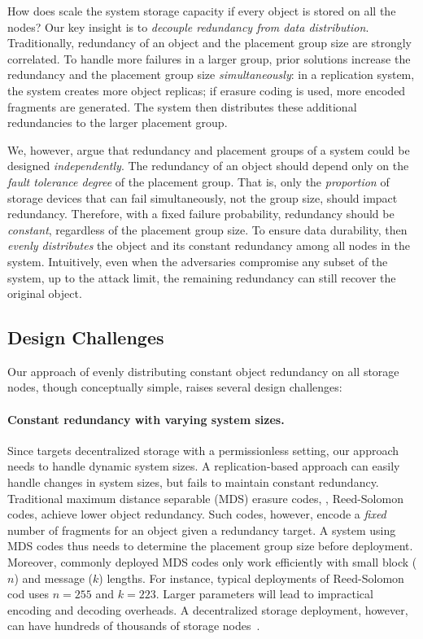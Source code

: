 How does \sys scale the system storage capacity if every object is stored on all the nodes?
Our key insight is to \emph{decouple redundancy from data distribution}.
Traditionally, redundancy of an object and the placement group size are strongly correlated.
To handle more failures in a larger group, prior solutions increase the redundancy and the placement group size \emph{simultaneously}:
in a replication system, the system creates more object replicas;
if erasure coding is used, more encoded fragments are generated.
The system then distributes these additional redundancies to the larger placement group.

We, however, argue that redundancy and placement groups of a system could be designed \emph{independently}.
The redundancy of an object should depend only on the \emph{fault tolerance degree} of the placement group.
That is, only the \emph{proportion} of storage devices that can fail simultaneously, not the group size, should impact redundancy.
Therefore, with a fixed failure probability, redundancy should be \emph{constant}, regardless of the placement group size.
To ensure data durability, \sys then \emph{evenly distributes} the object and its constant redundancy among all nodes in the system.
Intuitively, even when the adversaries compromise any subset of the system, up to the attack limit, the remaining redundancy can still recover the original object.

\subsection{Design Challenges}
\label{sec:approach:challenges}

Our approach of evenly distributing constant object redundancy on all storage nodes, though conceptually simple, raises several design challenges:

\paragraph{Constant redundancy with varying system sizes.}
Since \sys targets decentralized storage with a permissionless setting, our approach needs to handle dynamic system sizes.
A replication-based approach can easily handle changes in system sizes, but fails to maintain constant redundancy.
Traditional maximum distance separable (MDS) erasure codes, \eg,  Reed-Solomon codes, achieve lower object redundancy.
Such codes, however, encode a \emph{fixed} number of fragments for an object given a redundancy target.
A system using MDS codes thus needs to determine the placement group size before deployment.
Moreover, commonly deployed MDS codes only work efficiently with small block ($n$) and message ($k$) lengths.
For instance, typical deployments of Reed-Solomon cod uses $n = 255$ and $k = 223$.
Larger parameters will lead to impractical encoding and decoding overheads.
A decentralized storage deployment, however, can have hundreds of thousands of storage nodes~\cite{ipfs}.

